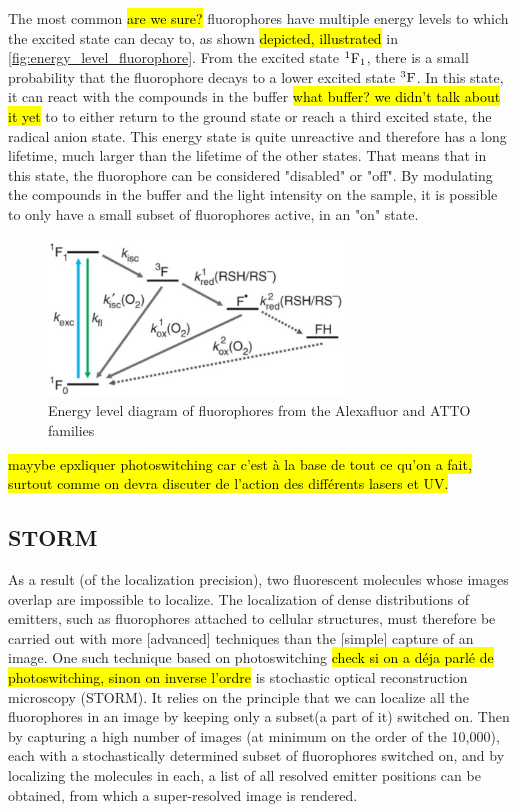 The most common \hl{are we sure?} fluorophores have multiple energy levels to which the excited state can decay to, as shown \hl{depicted, illustrated} in \autoref{fig:energy_level_fluorophore}. From the excited state $^1\textrm F_1$, there is a small probability that the fluorophore decays to a lower excited state $^3\textrm F$. In this state, it can react with the compounds in the buffer \hl{what buffer? we didn't talk about it yet} to to either return to the ground state or reach a third excited state, the radical anion state. This energy state is quite unreactive and therefore has a long lifetime, much larger than the lifetime of the other states. That means that in this state, the fluorophore can be considered "disabled" or "off". By modulating the compounds in the buffer and the light intensity on the sample, it is possible to only have a small subset of fluorophores active, in an "on" state.
\begin{figure}[htbp]
    \centering
    \includegraphics[width=0.7\textwidth]{figures/alexafluor-jablonski-diagram.png}
    \caption{Energy level diagram of fluorophores from the Alexafluor and ATTO families \cite{vandelinde-natureprotocols-2011}}
    \label{fig:energy_level_fluorophore}
\end{figure}
\hl{mayybe epxliquer photoswitching car c'est à la base de tout ce qu'on a fait, surtout comme on devra discuter de l'action des différents lasers et UV.}

\subsection{STORM}
As a result (of the localization precision), two fluorescent molecules whose images overlap are impossible to localize.
The localization of dense distributions of emitters, such as fluorophores attached to cellular structures, must therefore be carried out with more [advanced] techniques than the [simple] capture of an image.
One such technique based on photoswitching \hl{check si on a déja parlé de photoswitching, sinon on inverse l'ordre} is stochastic optical reconstruction microscopy (STORM).
It relies on the principle that we can localize all the fluorophores in an image by keeping only a subset(a part of it) switched on.
Then by capturing a high number of images (at minimum on the order of the 10,000), each with a stochastically determined subset of fluorophores switched on, and by localizing the molecules in each, a list of all resolved emitter positions can be obtained, from which a super-resolved image is rendered.

